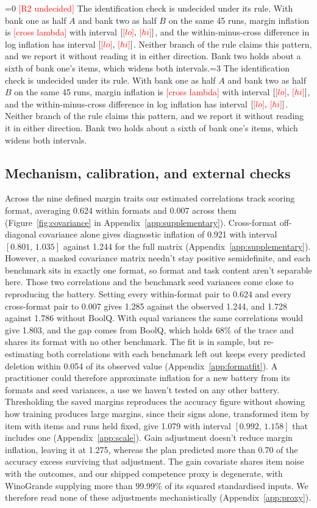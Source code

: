 \documentclass{article}
\newcommand{\ci}[2]{\ensuremath{[#1,\,#2]}}
\newcommand{\pending}[1]{\textcolor{red}{[#1]}}
\newcommand{\Rtwocase}{0}
\newcommand{\outcome}[4]{\ifnum#1=0 \pending{#3} #4\else\ifnum#1=#2 #4\fi\fi}
\begin{document}
\outcome{\Rtwocase}{3}{R2 undecided}{The identification check is undecided under its rule. With bank one as half $A$ and bank two as half $B$ on the same 45 runs, margin inflation is \pending{cross lambda} with interval \ci{\pending{lo}}{\pending{hi}}, and the within-minus-cross difference in log inflation has interval \ci{\pending{lo}}{\pending{hi}}. Neither branch of the rule claims this pattern, and we report it without reading it in either direction. Bank two holds about a sixth of bank one's items, which widens both intervals.}

\subsection{Mechanism, calibration, and external checks}
Across the nine defined margin traits our estimated correlations track scoring format, averaging 0.624 within formats and 0.007 across them (Figure~\ref{fig:covariance} in Appendix~\ref{app:supplementary}). Cross-format off-diagonal covariance alone gives diagnostic inflation of 0.921 with interval \ci{0.801}{1.035} against 1.244 for the full matrix (Appendix~\ref{app:supplementary}). However, a masked covariance matrix needn't stay positive semidefinite, and each benchmark sits in exactly one format, so format and task content aren't separable here. Those two correlations and the benchmark seed variances come close to reproducing the battery. Setting every within-format pair to 0.624 and every cross-format pair to 0.007 gives 1.285 against the observed 1.244, and 1.728 against 1.786 without BoolQ. With equal variances the same correlations would give 1.803, and the gap comes from BoolQ, which holds 68\% of the trace and shares its format with no other benchmark. The fit is in sample, but re-estimating both correlations with each benchmark left out keeps every predicted deletion within 0.054 of its observed value (Appendix~\ref{app:formatfit}). A practitioner could therefore approximate inflation for a new battery from its formats and seed variances, a use we haven't tested on any other battery. Thresholding the saved margins reproduces the accuracy figure without showing how training produces large margins, since their signs alone, transformed item by item with items and runs held fixed, give 1.079 with interval \ci{0.992}{1.158} that includes one (Appendix~\ref{app:scale}). Gain adjustment doesn't reduce margin inflation, leaving it at 1.275, whereas the plan predicted more than 0.70 of the accuracy excess surviving that adjustment. The gain covariate shares item noise with the outcomes, and our shipped competence proxy is degenerate, with WinoGrande supplying more than 99.99\% of its squared standardised inputs. We therefore read none of these adjustments mechanistically (Appendix~\ref{app:proxy}).
\end{document}
